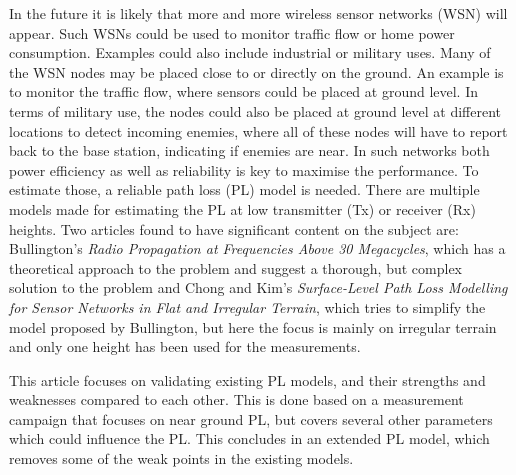 
In the future it is likely that more and more wireless sensor networks (WSN) will appear. Such WSNs could be used to monitor traffic flow or home power consumption. Examples could also include industrial or military uses. Many of the WSN nodes may be placed close to or directly on the ground. An example is to monitor the traffic flow, where sensors could be placed at ground level. In terms of military use, the nodes could also be placed at ground level at different locations to detect incoming enemies, where all of these nodes will have to report back to the base station, indicating if enemies are near. In such networks both power efficiency as well as reliability is key to maximise the performance. To estimate those, a reliable path loss (PL) model is needed.
There are multiple models made for estimating the PL at low transmitter (Tx) or receiver (Rx) heights. Two articles found to have significant content on the subject are: Bullington's \textit{Radio Propagation at Frequencies Above 30 Megacycles}, which has a theoretical approach to the problem and suggest a thorough, but complex solution to the problem and Chong and Kim's \textit{Surface-Level Path Loss Modelling for Sensor Networks in Flat and Irregular Terrain}, which tries to simplify the model proposed by Bullington, but here the focus is mainly on irregular terrain and only one height has been used for the measurements.

This article focuses on validating existing PL models, and their strengths and weaknesses compared to each other. This is done based on a measurement campaign that focuses on near ground PL, but covers several other parameters which could influence the PL. This concludes in an extended PL model, which removes some of the weak points in the existing models.



